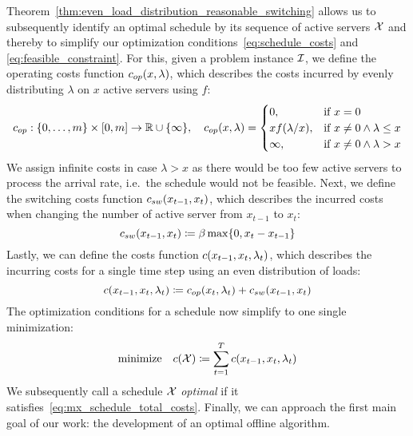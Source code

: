 Theorem~\ref{thm:even_load_distribution_reasonable_switching} allows us to subsequently identify an optimal schedule by its sequence of active servers $\mathcal{X}$ and thereby to simplify our optimization conditions~\eqref{eq:schedule_costs} and \eqref{eq:feasible_constraint}. 
For this, given a problem instance $\mathcal{I}$, we define the operating costs function $c_{op}(x,\lambda)$, which describes the costs incurred by evenly distributing $\lambda$ on $x$ active servers using $f$:
\begin{equation*}
	c_{op}:\{0,\ldots,m\}\times[0,m]\rightarrow\mathbb{R}\cup\{\infty\},\quad c_{op}(x,\lambda)=\begin{cases}
          0, & \text{if $x=0$}\\
	  x f(\lambda/x), & \text{if $x\ne 0\land\lambda\le x$}\\
	  \infty, & \text{if $x\ne 0\land\lambda>x$}
	  \end{cases}
\end{equation*}
We assign infinite costs in case $\lambda>x$ as there would be too few active servers to process the arrival rate, i.e.\ the schedule would not be feasible. Next, we define the switching costs function $c_{sw}(x_{t-1},x_t)$, which describes the incurred costs when changing the number of active server from $x_{t-1}$ to $x_t$:
\begin{equation}\label{eq:mx_schedule_sw_costs}
	c_{sw}(x_{t-1},x_t)\coloneqq\beta\max\{0,x_t-x_{t-1}\}
\end{equation}
Lastly, we can define the costs function $c(x_{t-1},x_t,\lambda_t)$, which describes the incurring costs for a single time step using an even distribution of loads:
\begin{equation}\label{eq:mx_schedule_costs}
	c(x_{t-1},x_{t},\lambda_t)\coloneqq c_{op}(x_t,\lambda_t)+c_{sw}(x_{t-1},x_t)
\end{equation}
The optimization conditions for a schedule now simplify to one single minimization:
\begin{align}
	\text{minimize}\quad c(\mathcal{X})\coloneqq\sum\limits_{t=1}^{T}c(x_{t-1},x_{t},\lambda_t)\label{eq:mx_schedule_total_costs}
\end{align}
We subsequently call a schedule $\mathcal{X}$ \textit{optimal} if it satisfies~\eqref{eq:mx_schedule_total_costs}. Finally, we can approach the first main goal of our work: the development of an optimal offline algorithm.
